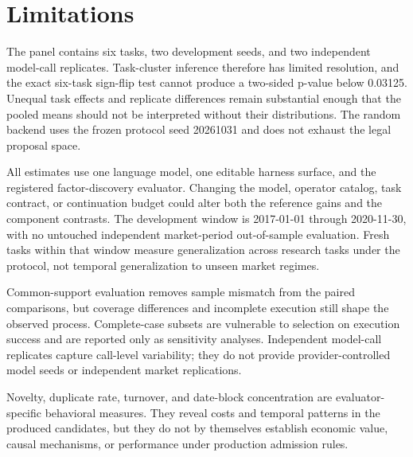 \section{Limitations}
\label{sec:limitations}

The panel contains six tasks, two development seeds, and two independent model-call replicates. Task-cluster inference therefore has limited resolution, and the exact six-task sign-flip test cannot produce a two-sided p-value below 0.03125. Unequal task effects and replicate differences remain substantial enough that the pooled means should not be interpreted without their distributions. The random backend uses the frozen protocol seed 20261031 and does not exhaust the legal proposal space.

All estimates use one language model, one editable harness surface, and the registered factor-discovery evaluator. Changing the model, operator catalog, task contract, or continuation budget could alter both the reference gains and the component contrasts. The development window is 2017-01-01 through 2020-11-30, with no untouched independent market-period out-of-sample evaluation. Fresh tasks within that window measure generalization across research tasks under the protocol, not temporal generalization to unseen market regimes.

Common-support evaluation removes sample mismatch from the paired comparisons, but coverage differences and incomplete execution still shape the observed process. Complete-case subsets are vulnerable to selection on execution success and are reported only as sensitivity analyses. Independent model-call replicates capture call-level variability; they do not provide provider-controlled model seeds or independent market replications.

Novelty, duplicate rate, turnover, and date-block concentration are evaluator-specific behavioral measures. They reveal costs and temporal patterns in the produced candidates, but they do not by themselves establish economic value, causal mechanisms, or performance under production admission rules.
